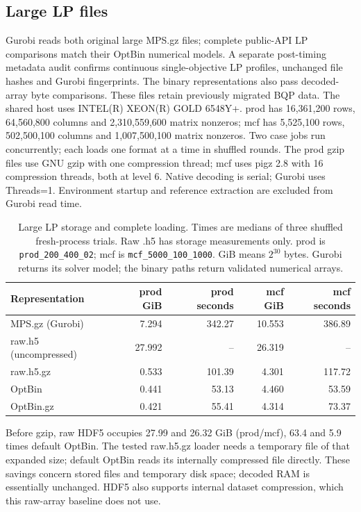 \documentclass[10pt]{article}
\begin{document}
\clearpage
\subsection*{Large LP files}
Gurobi reads both original large MPS.gz files; complete public-API LP comparisons match their OptBin numerical models. A separate post-timing metadata audit confirms continuous single-objective LP profiles, unchanged file hashes and Gurobi fingerprints. The binary representations also pass decoded-array byte comparisons. These files retain previously migrated BQP data. The shared host uses INTEL(R) XEON(R) GOLD 6548Y+. prod has 16,361,200 rows, 64,560,800 columns and 2,310,559,600 matrix nonzeros; mcf has 5,525,100 rows, 502,500,100 columns and 1,007,500,100 matrix nonzeros. Two case jobs run concurrently; each loads one format at a time in shuffled rounds. The prod gzip files use GNU gzip with one compression thread; mcf uses pigz 2.8 with 16 compression threads, both at level 6. Native decoding is serial; Gurobi uses Threads=1. Environment startup and reference extraction are excluded from Gurobi read time.

\begin{table}[ht]\centering\small
\begin{tabular}{lrrrr}\toprule
Representation & prod GiB & prod seconds & mcf GiB & mcf seconds \\ \midrule
MPS.gz (Gurobi) & 7.294 & 342.27 & 10.553 & 386.89 \\
raw.h5 (uncompressed) & 27.992 & -- & 26.319 & -- \\
raw.h5.gz & 0.533 & 101.39 & 4.301 & 117.72 \\
OptBin & 0.441 & 53.13 & 4.460 & 53.59 \\
OptBin.gz & 0.421 & 55.41 & 4.314 & 73.37 \\
\bottomrule\end{tabular}
\caption{Large LP storage and complete loading. Times are medians of three shuffled fresh-process trials. Raw .h5 has storage measurements only. prod is \texttt{prod\_200\_400\_02}; mcf is \texttt{mcf\_5000\_100\_1000}. GiB means $2^{30}$ bytes. Gurobi returns its solver model; the binary paths return validated numerical arrays.}\end{table}

Before gzip, raw HDF5 occupies 27.99 and 26.32 GiB (prod/mcf), 63.4 and 5.9 times default OptBin. The tested raw.h5.gz loader needs a temporary file of that expanded size; default OptBin reads its internally compressed file directly. These savings concern stored files and temporary disk space; decoded RAM is essentially unchanged. HDF5 also supports internal dataset compression, which this raw-array baseline does not use.
\end{document}
